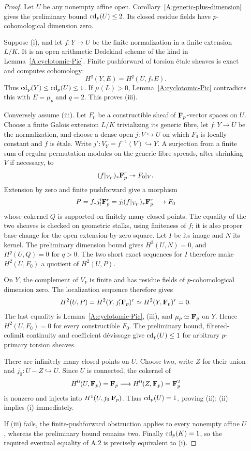 \begin{proof}
Let $U$ be any nonempty affine open. Corollary~\ref{A:generic-plus-dimension}
gives the preliminary bound $\operatorname{cd}_p(U)\leq2$. Its closed residue fields
have $p$-cohomological dimension zero.

Suppose (i), and let $f:Y\to U$ be the finite normalization in
a finite extension $L/K$. It is an open arithmetic Dedekind scheme
of the kind in Lemma~\ref{A:cyclotomic-Pic}. Finite pushforward of
torsion étale sheaves is exact and computes cohomology:
\[
 H^q(Y,E)=H^q(U,f_*E).
\]
Thus $\operatorname{cd}_p(Y)\leq\operatorname{cd}_p(U)\leq1$.
If $\mu(L)>0$, Lemma~\ref{A:cyclotomic-Pic} contradicts this with
$E=\mu_p$ and $q=2$. This proves (iii).

Conversely assume (iii). Let $F_0$ be a constructible sheaf of
$\mathbf F_p$-vector spaces on $U$. Choose a finite Galois extension $L/K$
trivializing its generic fibre, let $f:Y\to U$ be the normalization,
and choose a dense open $j:V\hookrightarrow U$ on which $F_0$ is
locally constant and $f$ is étale. Write
$j':V_Y=f^{-1}(V)\hookrightarrow Y$. A surjection from a finite sum
of regular permutation modules on the generic fibre spreads, after
shrinking $V$ if necessary, to
\[
 (f|_{V_Y})_*\mathbf F_p^r\twoheadrightarrow F_0|_V.
\]
Extension by zero and finite pushforward give a morphism
\[
 P=f_*j'_!\mathbf F_p^r=j_!(f|_{V_Y})_*\mathbf F_p^r\longrightarrow F_0
\]
whose cokernel $Q$ is supported on finitely many closed points.
The equality of the two sheaves is checked on geometric stalks,
using finiteness of $f$; it is also proper base change for the open
extension-by-zero square. Let $I$ be its image and $N$ its kernel.
The preliminary dimension bound gives $H^3(U,N)=0$, and
$H^q(U,Q)=0$ for $q>0$. The two short exact sequences for $I$
therefore make $H^2(U,F_0)$ a quotient of $H^2(U,P)$.

On $Y$, the complement of $V_Y$ is finite and has residue fields
of $p$-cohomological dimension zero. The localization sequence
therefore gives
\[
 H^2(U,P)=H^2(Y,j'_!\mathbf F_p)^r
          \simeq H^2(Y,\mathbf F_p)^r=0.
\]
The last equality is Lemma~\ref{A:cyclotomic-Pic}, (iii), and
$\mu_p\simeq\mathbf F_p$ on $Y$. Hence $H^2(U,F_0)=0$ for every
constructible $F_0$. The preliminary bound, filtered-colimit
continuity and coefficient d\'evissage give $\operatorname{cd}_p(U)\leq1$ for
arbitrary $p$-primary torsion sheaves.

There are infinitely many closed points on $U$. Choose two,
write $Z$ for their union and $j_0:U-Z\hookrightarrow U$.
Since $U$ is connected, the cokernel of
\[
 H^0(U,\mathbf F_p)=\mathbf F_p\longrightarrow H^0(Z,\mathbf F_p)=\mathbf F_p^2
\]
is nonzero and injects into $H^1(U,j_{0!}\mathbf F_p)$. Thus $\operatorname{cd}_p(U)=1$,
proving (ii); (ii) implies (i) immediately.

If (iii) fails, the finite-pushforward obstruction applies to every
nonempty affine $U$, whereas the preliminary bound remains two.
Finally $\operatorname{cd}_p(K)=1$, so the required eventual equality of A.2
is precisely equivalent to (i).
\end{proof}

